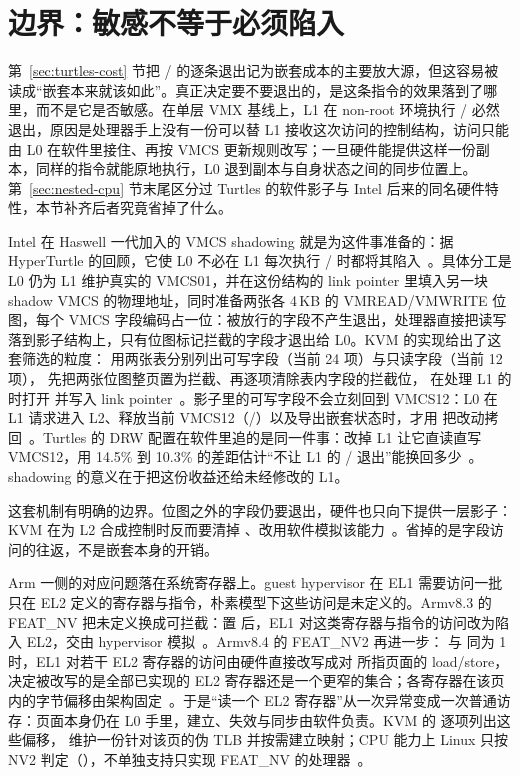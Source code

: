 \section{边界：敏感不等于必须陷入}\label{sec:nested-notrap}

第~\ref{sec:turtles-cost} 节把 / 的逐条退出记为嵌套成本的主要放大源，但这容易被读成“嵌套本来就该如此”。真正决定要不要退出的，是这条指令的效果落到了哪里，而不是它是否敏感。在单层 VMX 基线上，L1 在 non-root 环境执行 / 必然退出，原因是处理器手上没有一份可以替 L1 接收这次访问的控制结构，访问只能由 L0 在软件里接住、再按 VMCS 更新规则改写；一旦硬件能提供这样一份副本，同样的指令就能原地执行，L0 退到副本与自身状态之间的同步位置上。第~\ref{sec:nested-cpu} 节末尾区分过 Turtles 的软件影子与 Intel 后来的同名硬件特性，本节补齐后者究竟省掉了什么。

Intel 在 Haswell 一代加入的 VMCS shadowing 就是为这件事准备的：据 HyperTurtle 的回顾，它使 L0 不必在 L1 每次执行 / 时都将其陷入~\cite{source8}。具体分工是 L0 仍为 L1 维护真实的 VMCS01，并在这份结构的 link pointer 里填入另一块 shadow VMCS 的物理地址，同时准备两张各 4\,KB 的 VMREAD/VMWRITE 位图，每个 VMCS 字段编码占一位：被放行的字段不产生退出，处理器直接把读写落到影子结构上，只有位图标记拦截的字段才退出给 L0。KVM 的实现给出了这套筛选的粒度： 用两张表分别列出可写字段（当前 24 项）与只读字段（当前 12 项）， 先把两张位图整页置为拦截、再逐项清除表内字段的拦截位， 在处理 L1 的  时打开  并写入 link pointer~\cite{source5}。影子里的可写字段不会立刻回到 VMCS12：L0 在 L1 请求进入 L2、释放当前 VMCS12（/）以及导出嵌套状态时，才用  把改动拷回~\cite{source5}。Turtles 的 DRW 配置在软件里追的是同一件事：改掉 L1 让它直读直写 VMCS12，用 14.5\% 到 10.3\% 的差距估计“不让 L1 的 / 退出”能换回多少~\cite{source7}。shadowing 的意义在于把这份收益还给未经修改的 L1。

这套机制有明确的边界。位图之外的字段仍要退出，硬件也只向下提供一层影子：KVM 在为 L2 合成控制时反而要清掉 、改用软件模拟该能力~\cite{source5}。省掉的是字段访问的往返，不是嵌套本身的开销。

Arm 一侧的对应问题落在系统寄存器上。guest hypervisor 在 EL1 需要访问一批只在 EL2 定义的寄存器与指令，朴素模型下这些访问是未定义的。Armv8.3 的 FEAT\_NV 把未定义换成可拦截：置  后，EL1 对这类寄存器与指令的访问改为陷入 EL2，交由 hypervisor 模拟~\cite{source4}。Armv8.4 的 FEAT\_NV2 再进一步： 与  同为 1 时，EL1 对若干 EL2 寄存器的访问由硬件直接改写成对  所指页面的 load/store， 决定被改写的是全部已实现的 EL2 寄存器还是一个更窄的集合；各寄存器在该页内的字节偏移由架构固定~\cite{source4}。于是“读一个 EL2 寄存器”从一次异常变成一次普通访存：页面本身仍在 L0 手里，建立、失效与同步由软件负责。KVM 的  逐项列出这些偏移， 维护一份针对该页的伪 TLB 并按需建立映射；CPU 能力上 Linux 只按 NV2 判定（），不单独支持只实现 FEAT\_NV 的处理器~\cite{source5}。

